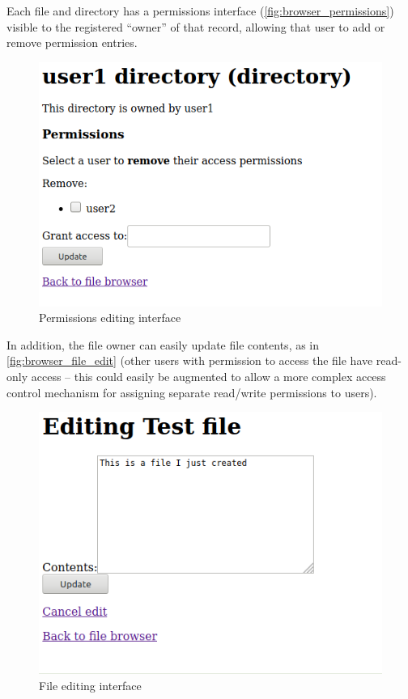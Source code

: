 \documentclass[12pt]{report}
\begin{document}
Each file and directory has a permissions interface (\autoref{fig:browser_permissions}) visible to the registered ``owner'' of that record, allowing that user to add or remove permission entries.

\begin{figure}[h]
  \begin{center}
    \includegraphics[scale=0.5]{06-browser2-perms.png}
  \end{center}
  \caption{Permissions editing interface}
  \label{fig:browser_permissions}
\end{figure}

In addition, the file owner can easily update file contents, as in \autoref{fig:browser_file_edit} (other users with permission to access the file have read-only access -- this could easily be augmented to allow a more complex access control mechanism for assigning separate read/write permissions to users).

\begin{figure}[h]
  \begin{center}
    \includegraphics[scale=0.5]{07-browser3-file-contents.png}
  \end{center}
  \caption{File editing interface}
  \label{fig:browser_file_edit}
\end{figure}
\end{document}
